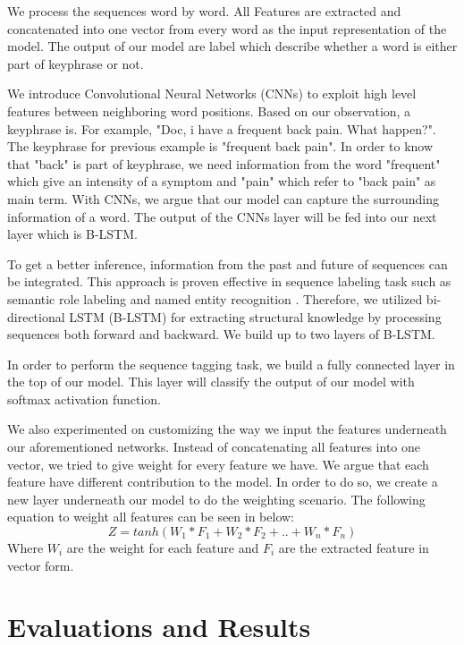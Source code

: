 We process the sequences word by word. All Features are extracted and concatenated into one vector from every word as the input representation of the model. The output of our model are label which describe whether a word is either part of keyphrase or not. 

We introduce Convolutional Neural Networks (CNNs) to exploit high level features between neighboring word positions. Based on our observation, a keyphrase is. For example, "Doc, i have a frequent back pain. What happen?". The keyphrase for previous example is "frequent back pain". In order to know that "back" is part of keyphrase, we need information from the word "frequent" which give an intensity of a symptom and "pain" which refer to "back pain" as main term. With CNNs, we argue that our model can capture the surrounding information of a word. The output of the CNNs layer will be fed into our next layer which is B-LSTM.

To get a better inference, information from the past and future of sequences can be integrated. This approach is proven effective  in sequence labeling task such as semantic role labeling \cite{SMRzhou2015end} and named entity recognition \cite{ma2016end}. Therefore, we utilized  bi-directional LSTM (B-LSTM) for extracting structural knowledge by processing sequences both forward and backward. We build up to two layers of B-LSTM.

In order to perform the sequence tagging task, we build a fully connected layer in the top of our model. This layer will classify the output of our model with softmax activation function.

We also experimented on customizing the way we input the features underneath our aforementioned networks. Instead of concatenating all features into one vector, we tried to give weight for every feature we have. We argue that each feature have different contribution to the model. In order to do so, we create a new layer underneath our model to do the weighting scenario. The following equation to weight all features can be seen in below:
\begin{equation}
Z =  tanh(W _{1}*F_{1} + W_{2}*F_{2} + .. + W_{n}*F_{n})
\end{equation}
Where $W_{i}$ are the weight for each feature and $F_{i}$ are the extracted feature in vector form.


\section{Evaluations and Results}
